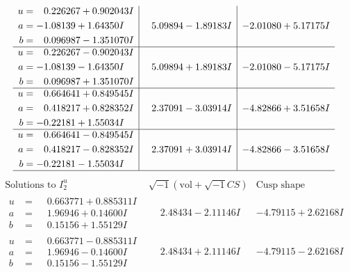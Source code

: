 \documentclass[1p]{elsarticle_modified}
\theoremstyle{definition}
\newcommand{\I}{\sqrt{-1}}
\begin{document}
$$\begin{array}{c|c|c}
\begin{aligned}
u &= \phantom{-}0.226267 + 0.902043 I \\
a &= -1.08139 + 1.64350 I \\
b &= \phantom{-}0.096987 - 1.351070 I\end{aligned}
 & \phantom{-}5.09894 - 1.89183 I & -2.01080 + 5.17175 I \\ \hline\begin{aligned}
u &= \phantom{-}0.226267 - 0.902043 I \\
a &= -1.08139 - 1.64350 I \\
b &= \phantom{-}0.096987 + 1.351070 I\end{aligned}
 & \phantom{-}5.09894 + 1.89183 I & -2.01080 - 5.17175 I \\ \hline\begin{aligned}
u &= \phantom{-}0.664641 + 0.849545 I \\
a &= \phantom{-}0.418217 + 0.828352 I \\
b &= -0.22181 + 1.55034 I\end{aligned}
 & \phantom{-}2.37091 - 3.03914 I & -4.82866 + 3.51658 I \\ \hline\begin{aligned}
u &= \phantom{-}0.664641 - 0.849545 I \\
a &= \phantom{-}0.418217 - 0.828352 I \\
b &= -0.22181 - 1.55034 I\end{aligned}
 & \phantom{-}2.37091 + 3.03914 I & -4.82866 - 3.51658 I\\
 \hline 
 \end{array}$$\newpage$$\begin{array}{c|c|c}  
\text{Solutions to }I^u_{2}& \I (\text{vol} + \sqrt{-1}CS) & \text{Cusp shape}\\
 \hline 
\begin{aligned}
u &= \phantom{-}0.663771 + 0.885311 I \\
a &= \phantom{-}1.96946 + 0.14600 I \\
b &= \phantom{-}0.15156 + 1.55129 I\end{aligned}
 & \phantom{-}2.48434 - 2.11146 I & -4.79115 + 2.62168 I \\ \hline\begin{aligned}
u &= \phantom{-}0.663771 - 0.885311 I \\
a &= \phantom{-}1.96946 - 0.14600 I \\
b &= \phantom{-}0.15156 - 1.55129 I\end{aligned}
 & \phantom{-}2.48434 + 2.11146 I & -4.79115 - 2.62168 I \\ \hline\begin{aligned}

\end{aligned}
\end{array}$$
\end{document}
